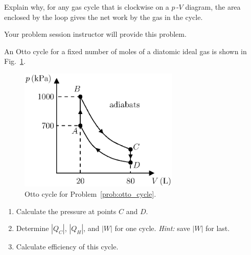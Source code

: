 \begin{problem} 
  Explain why, for any gas cycle that is clockwise on a $p$\,-$V$
  diagram, the area enclosed by the loop gives the net work by the gas
  in the cycle.
\end{problem}

\begin{problem} 
  Your problem session instructor will provide this problem.
\end{problem}

\begin{problem} 
  An Otto cycle for a fixed number of moles of a diatomic ideal gas is shown in
  Fig.~\ref{fig:otto_cycle_hw}. 
  \begin{figure}[h]
    \begin{center}
      \includegraphics[width=3in]{heat_engines/otto_cycle_hw.eps}
      \caption{Otto cycle for Problem~\ref{prob:otto_cycle}.}
      \label{fig:otto_cycle_hw}
    \end{center}
  \end{figure}
   \begin{enumerate}
   \item Calculate the pressure at points $C$ and $D$.
   \item Determine $|Q_C|$, $|Q_H|$, and $|W|$ for one cycle.  {\it
       Hint:} save $|W|$ for last.
   \item Calculate efficiency of this cycle. 
   \end{enumerate}
   \label{prob:otto_cycle}
\end{problem}

